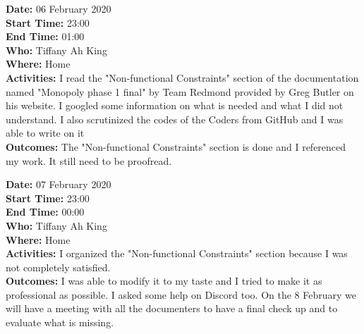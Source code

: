 \documentclass[12pt]{article}
\begin{document}
{\bf Date:} 06 February 2020\\
{\bf Start Time:} 23:00\\
{\bf End Time:} 01:00\\
{\bf Who:} Tiffany Ah King\\
{\bf Where:} Home\\
{\bf Activities:} I read the "Non-functional Constraints" section of the documentation named "Monopoly phase 1 final" by Team Redmond provided by Greg Butler on his website. I googled some information on what is needed and what I did not understand. I also scrutinized the codes of the Coders from GitHub and I was able to write on it \\
{\bf Outcomes:} The "Non-functional Constraints" section is done and I referenced my work. It still need to be proofread.

{\bf Date:} 07 February 2020\\
{\bf Start Time:} 23:00\\
{\bf End Time:} 00:00 \\
{\bf Who:} Tiffany Ah King\\
{\bf Where:} Home\\
{\bf Activities:} I organized the "Non-functional Constraints" section  because I was not completely satisfied. \\
{\bf Outcomes:} I was able to modify it to my taste and I tried to make it as professional as possible. I asked some help on Discord too. On the 8 February we will have a meeting with all the documenters to have a final check up and to evaluate what is missing.


\end{document}
